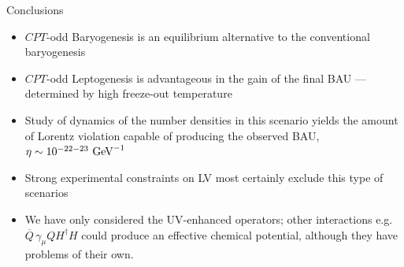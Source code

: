 \documentclass[pdf,UofT06talk,slideColor,colorBG,accumulate]{prosper}
\newcommand{\ov}{\overline}
\newcommand{\GeV}{{\rm GeV}}
\begin{document}
\begin{slide}{Conclusions}

\begin{itemize}
\item	$ CPT $-odd Baryogenesis is an equilibrium alternative to the 
	conventional baryogenesis 

\item   $ CPT $-odd Leptogenesis is advantageous in the {\mybf gain}
	of the final BAU --- determined by high freeze-out temperature

\item	Study of dynamics of the number densities in this scenario
	yields the amount of Lorentz violation capable of 
	producing the observed BAU, $ \eta \sim 10^{-22-23}~\GeV^{-1} $

\item   Strong experimental constraints on LV most certainly exclude 
	this type of scenarios

\item	We have only considered the {\myit UV-enhanced} operators;
	other interactions {\myit e.g.} $ \ov{Q}\, \gamma_\mu Q H^\dag H $
	could produce an effective chemical potential, although
	they have problems of their own.
\end{itemize}

\end{slide}
\end{document}
